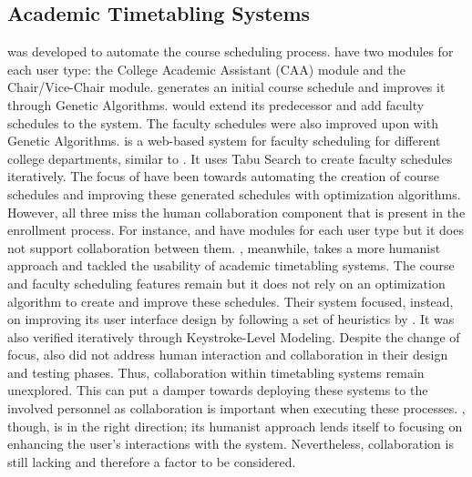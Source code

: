 \subsection{Academic Timetabling Systems}
\cite{Assyst} was developed to automate the course scheduling process. \cite{Assyst} have two modules for each user type: the College Academic Assistant (CAA) module and the Chair/Vice-Chair module. \cite{Assyst} generates an initial course schedule and improves it through Genetic Algorithms. \cite{Assyst2} would extend its predecessor and add faculty schedules to the system. The faculty schedules were also improved upon with Genetic Algorithms. \cite{eAssyst} is a web-based system for faculty scheduling for different college departments, similar to \cite{Assyst2}. It uses Tabu Search to create faculty schedules iteratively. The focus of \cite{Assyst, Assyst2, eAssyst} have been towards automating the creation of course schedules and improving these generated schedules with optimization algorithms. However, all three miss the human collaboration component that is present in the enrollment process. For instance, \cite{Assyst} and \cite{Assyst2} have modules for each user type but it does not support collaboration between them. \cite{arrowSmith}, meanwhile, takes a more humanist approach and tackled the usability of academic timetabling systems. The course and faculty scheduling features remain but it does not rely on an optimization algorithm to create and improve these schedules. Their system focused, instead, on improving its user interface design by following a set of heuristics by \cite{Paz}. It was also verified iteratively through Keystroke-Level Modeling. Despite the change of focus, \cite{arrowSmith} also did not address human interaction and collaboration in their design and testing phases. Thus, collaboration within timetabling systems remain unexplored. This can put a damper towards deploying these systems to the involved personnel as collaboration is important when executing these processes. \cite{arrowSmith}, though, is in the right direction; its humanist approach lends itself to focusing on enhancing the user's interactions with the system. Nevertheless, collaboration is still lacking and therefore a factor to be considered.


